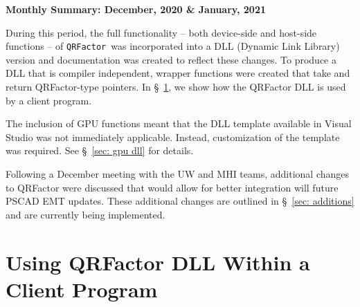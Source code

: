 \documentclass[11pt,letterpaper]{article}
\newcommand{\qrf}{\texttt{QRFactor}}
\begin{document}
\begin{center}
    {\Large \bf Monthly Summary: December, 2020 \& January, 2021}
\end{center}

During this period, the full functionality -- both device-side and host-side functions -- of \qrf~was incorporated into a DLL (Dynamic Link Library) version and documentation was created to reflect these changes. To produce a DLL that is compiler independent, wrapper functions were created that take and return QRFactor-type pointers. In \S\!~\ref{sec: client}, we show how the QRFactor DLL is used by a client program.

The inclusion of GPU functions meant that the DLL template available in Visual Studio was not immediately applicable. Instead, customization of the template was required. See \S\!~\ref{sec: gpu dll} for details.

Following a December meeting with the UW and MHI teams, additional changes to QRFactor were discussed that would allow for better integration will future PSCAD EMT updates. These additional changes are outlined in \S\!~\ref{sec: additions} and are currently being implemented.

\section{Using QRFactor DLL Within a Client Program}
\label{sec: client}
\end{document}
